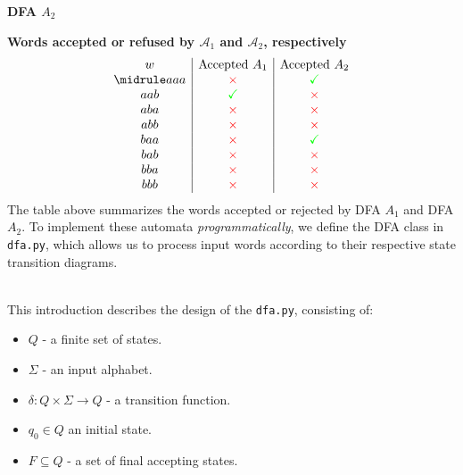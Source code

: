 \documentclass{article}
\theoremstyle{theorem}
\theoremstyle{definition}
\theoremstyle{remark}
\begin{document}
\begin{center}
\textbf{DFA $A_2$}
\end{center}


\textbf{Words accepted or refused by $\mathcal A_1$ and $\mathcal A_2$, respectively}
\[
\begin{array}{c|c|c}
w & \text{Accepted } A_1 & \text{Accepted } A_2 \\ \midrule
aaa & \textcolor{red}{\times} & \textcolor{green}{\checkmark} \\
aab & \textcolor{green}{\checkmark} & \textcolor{red}{\times} \\
aba & \textcolor{red}{\times} & \textcolor{red}{\times} \\
abb & \textcolor{red}{\times} & \textcolor{red}{\times} \\
baa & \textcolor{red}{\times} & \textcolor{green}{\checkmark} \\
bab & \textcolor{red}{\times} & \textcolor{red}{\times} \\
bba & \textcolor{red}{\times} & \textcolor{red}{\times} \\
bbb & \textcolor{red}{\times} & \textcolor{red}{\times} \\
\end{array}
\]
\noindent The table above summarizes the words accepted or rejected by DFA $A_1$ and DFA $A_2$. 
To implement these automata \textit{programmatically}, we define the DFA class in \texttt{dfa.py}, which allows us to process input words according to their respective state transition diagrams.

\textbf{}\\
This introduction describes the design of the \texttt{dfa.py},  consisting of:
\begin{itemize}
  \item$Q$ - a finite set of states.
  \item$\Sigma$ - an input alphabet.
  \item$\delta : Q \times \Sigma \to Q$ - a transition function.
  \item$q_0 \in Q$ an initial state.
  \item$F \subseteq Q$ - a set of final accepting states.
\end{itemize}
\end{document}

